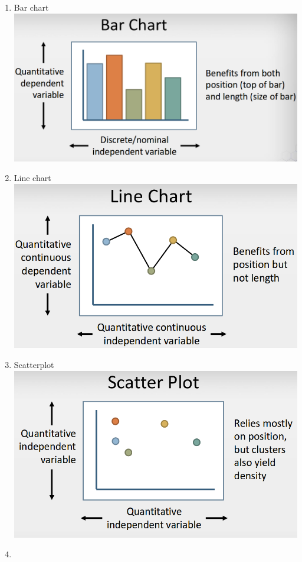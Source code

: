\documentclass[11pt]{article}
\makeatletter
\def\maxwidth{\ifdim\Gin@nat@width>\linewidth\linewidth
    \else\Gin@nat@width\fi}
\let\Oldincludegraphics\includegraphics
\renewcommand{\includegraphics}[1]{\Oldincludegraphics[width=.8\maxwidth]{#1}}
\providecommand{\tightlist}{%
      \setlength{\itemsep}{0pt}\setlength{\parskip}{0pt}}
\makeatother
\begin{document}
\begin{enumerate}
\def\labelenumi{\arabic{enumi}.}
\tightlist
\item
  Bar chart \includegraphics{images/bar.png} 
\item
  Line chart \includegraphics{images/line.png} 
\item
  Scatterplot \includegraphics{images/scatter.png}\\
\item

\end{enumerate}
\end{document}
